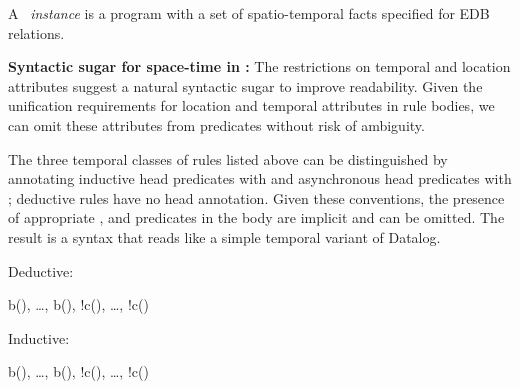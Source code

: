 
A \lang\ {\em instance} is a program with a set of spatio-temporal facts specified for EDB relations. 

\noindent
\textbf{Syntactic sugar for space-time in \lang:}
The restrictions on temporal and location attributes suggest a natural syntactic sugar to improve readability.  Given the unification requirements for location and temporal attributes in rule bodies, we can omit these attributes from predicates without risk of ambiguity.  

The three temporal classes of rules listed above can be distinguished by
annotating inductive head predicates with  and asynchronous head
predicates with ; deductive rules have no head annotation. 
Given these conventions, the presence of appropriate ,
 and  predicates in the body are implicit and can
be omitted.  The result is a syntax that reads like a simple temporal variant of
Datalog.

Deductive:

\begin{Drules}
        {b(), \ldots, b(), !c(), \ldots, !c()}
\end{Drules}

Inductive:

\begin{Drules}
        {b(), \ldots, b(), !c(), \ldots, !c()}
\end{Drules}

